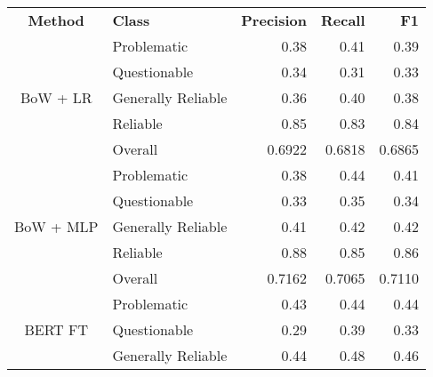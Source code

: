 \begin{table}[htbp]
    \centering
    \scriptsize
    \begin{longtable}{| c | l | r | r | r |}
        \hline                            \textbf{Method} & \textbf{Class}     & \textbf{Precision} & \textbf{Recall} & \textbf{F1}     \\\cline{1-5}
        \multirow{5}{*}{BoW + LR}                         & Problematic        & 0.38               & 0.41            & 0.39            \\
                                                          & Questionable       & 0.34               & 0.31            & 0.33            \\
                                                          & Generally Reliable & 0.36               & 0.40            & 0.38            \\
                                                          & Reliable           & 0.85               & 0.83            & 0.84            \\\cline{2-5}
                                                          & Overall            & 0.6922             & 0.6818          & 0.6865          \\
        \hline
        \multirow{5}{*}{BoW + MLP}                        & Problematic        & 0.38               & 0.44            & 0.41            \\
                                                          & Questionable       & 0.33               & 0.35            & 0.34            \\
                                                          & Generally Reliable & 0.41               & 0.42            & 0.42            \\
                                                          & Reliable           & 0.88               & 0.85            & 0.86            \\\cline{2-5}
                                                          & Overall            & 0.7162             & 0.7065          & 0.7110          \\
        \hline
        \multirow{5}{*}{BERT FT}                          & Problematic        & 0.43               & 0.44            & 0.44            \\
                                                          & Questionable       & 0.29               & 0.39            & 0.33            \\
                                                          & Generally Reliable & 0.44               & 0.48            & 0.46            \\

\end{longtable}
\end{table}

